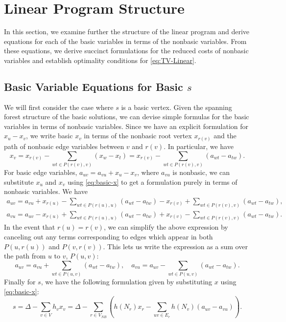 \documentclass[titlepage,11pt]{article}
\begin{document}
\section{Linear Program Structure}\label{sec:basic-equations}
In this section, we examine further the structure of the linear program and derive equations for each of the basic variables in terms of the nonbasic variables. From these equations, we derive succinct formulations for the reduced costs of nonbasic variables and establish optimality conditions for \eqref{eq:TV-Linear}.

\subsection{Basic Variable Equations for Basic $s$}

We will first consider the case where $s$ is a basic vertex.
Given the spanning forest structure of the basic solutions, we can devise simple formulas for the basic variables in terms of nonbasic variables. 
Since we have an explicit formulation for $x_u - x_v$, we write basic $x_v$ in terms of the nonbasic root vertex $x_{r(v)}$ and the path of nonbasic edge variables between $v$ and $r(v)$. In particular, we have
\begin{equation}\label{eq:basic-x}
    x_v = x_{r(v)} - \sum_{wt \in P(r(v),v)}(x_w - x_t) = x_{r(v)} - \sum_{wt \in P(r(v),v)}(a_{wt} - a_{tw}).
\end{equation}
For basic edge variables, $a_{uv} = a_{vu} + x_u - x_v$, where $a_{vu}$ is nonbasic, we can substitute $x_u$ and $x_v$ using \eqref{eq:basic-x} to get a formulation purely in terms of nonbasic variables. We have
\begin{align}
    a_{uv} = a_{vu} + x_{r(u)} - \sum_{wt \in P(r(u),u)}(a_{wt} - a_{tw}) - x_{r(v)} + \sum_{wt \in P(r(v),v)}(a_{wt} - a_{tw}), \label{eq:basic-a-plus}\\
    a_{vu} = a_{uv} - x_{r(u)} + \sum_{wt \in P(r(u),u)}(a_{wt} - a_{tw}) + x_{r(v)} - \sum_{wt \in P(r(v),v)}(a_{wt} - a_{tw}).\label{eq:basic-a-minus}
\end{align}
In the event that $r(u) = r(v)$, we can simplify the above expression by canceling out any terms corresponding to edges which appear in both $P(u,r(u))$ and $P(v, r(v))$. This lets us write the expression as a sum over the path from $u$ to $v$, $P(u, v)$:
\begin{equation}\label{eq:basic-a-plus-loop}
    a_{uv} = a_{vu} + \sum_{wt \in P(u,v)}(a_{wt} - a_{tw}), \quad    a_{vu} = a_{uv} - \sum_{wt \in P(u,v)}(a_{wt} - a_{tw}). 
\end{equation}
Finally for $s$, we have the following formulation given by substituting $x$ using \eqref{eq:basic-x}:
\begin{equation}\label{eq:basic-s}
    s = \Delta - \sum_{v \in V}h_vx_v = \Delta - \sum_{r \in V_{NB}}\left(h(N_r)x_r - \sum_{uv \in E_r}h(N_v)(a_{uv} - a_{vu}) \right).
\end{equation}
\end{document}
